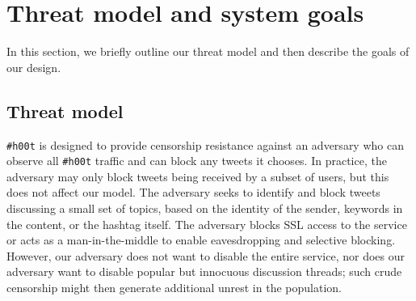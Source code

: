 \documentclass{sig-alternate-arxiv}
\newcommand{\hoot}{{\tt \#h00t}\xspace}
\begin{document}
% 
% 	
% 
% 
% 
% 
% 
% 
% 
% 
% 
% 

%
\section{Threat model and system goals}

In this section, we briefly outline our threat model and then describe
the goals of our design.

\subsection{Threat model} \label{sec:threat}
\hoot is designed to provide censorship resistance against an adversary
who can observe all \hoot traffic and can block any tweets it
chooses. In practice, the adversary may only block tweets being received
by a subset of users, but this does not affect our model. The adversary
seeks to identify and block tweets discussing a small set of topics,
based on the identity of the sender, keywords in the content, or the
hashtag itself. The adversary blocks SSL access to the service or acts
as a man-in-the-middle to enable eavesdropping and selective blocking.
However, our adversary does not want to disable the entire service, nor
does our adversary want to disable popular but innocuous discussion
threads; such crude censorship might then generate additional unrest in
the population.
\end{document}
